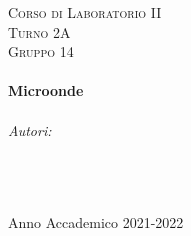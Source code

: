 \documentclass[a4paper]{article}
\begin{document}
\begin{titlepage}
\center
    
\textsc{\LARGE Corso di Laboratorio II}\\[1.5cm] %
\textsc{\large Turno 2A}\\[0.5cm] %
\textsc{\large Gruppo 14}\\[0.5cm]

\HRule \\[0.6cm]
{ \huge \bfseries Microonde}\\[0.4cm] %
\HRule \\[1.5cm]
    

\Large \emph{Autori:} \\
\textsc{} \\
\textsc{} \\
\textsc{} \\ [4cm]

\vspace{8cm}

{\large Anno Accademico 2021-2022}\\[2cm] %


\vfill
\end{titlepage}




\tableofcontents
\clearpage

\listoffigures
{}
\clearpage

\setcounter{page}{1}
\end{document}
